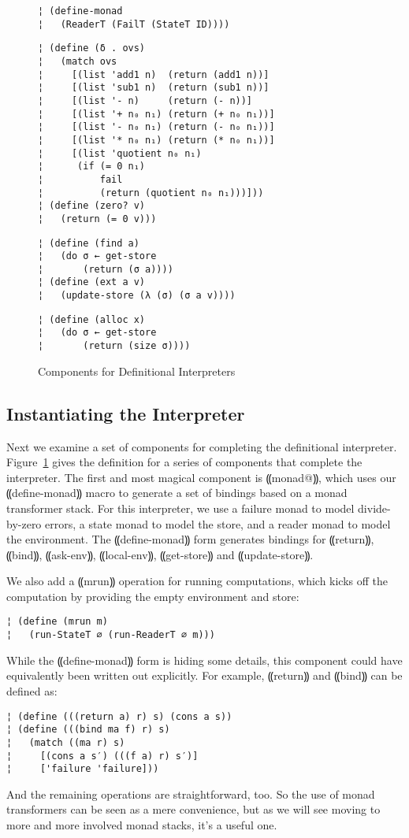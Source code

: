 \begin{figure}
\begin{lstlisting}
¦ (define-monad 
¦   (ReaderT (FailT (StateT ID))))
\end{lstlisting}
\figskip{}
\begin{lstlisting}
¦ (define (δ . ovs)
¦   (match ovs
¦     [(list 'add1 n)  (return (add1 n))]
¦     [(list 'sub1 n)  (return (sub1 n))]
¦     [(list '- n)     (return (- n))]
¦     [(list '+ n₀ n₁) (return (+ n₀ n₁))]
¦     [(list '- n₀ n₁) (return (- n₀ n₁))]
¦     [(list '* n₀ n₁) (return (* n₀ n₁))]
¦     [(list 'quotient n₀ n₁)
¦      (if (= 0 n₁)
¦          fail
¦          (return (quotient n₀ n₁)))]))
¦ (define (zero? v)
¦   (return (= 0 v)))
\end{lstlisting}
\figskip{}
\begin{lstlisting}
¦ (define (find a)
¦   (do σ ← get-store
¦       (return (σ a))))
¦ (define (ext a v) 
¦   (update-store (λ (σ) (σ a v))))
\end{lstlisting}
\figskip{}
\begin{lstlisting}
¦ (define (alloc x)
¦   (do σ ← get-store
¦       (return (size σ))))
\end{lstlisting}
\caption{Components for Definitional Interpreters}
\label{f:concrete-components}
\end{figure}

\subsection{Instantiating the Interpreter}

Next we examine a set of components for completing the definitional
interpreter.  Figure~\ref{f:concrete-components} gives the definition for a
series of components that complete the interpreter.  The first and most magical
component is ⸨monad@⸩, which uses our ⸨define-monad⸩ macro to generate a set of
bindings based on a monad transformer stack.  For this interpreter, we use a
failure monad to model divide-by-zero errors, a state monad to model the store,
and a reader monad to model the environment.  The ⸨define-monad⸩ form generates
bindings for ⸨return⸩, ⸨bind⸩, ⸨ask-env⸩, ⸨local-env⸩, ⸨get-store⸩ and
⸨update-store⸩. 

We also add a ⸨mrun⸩ operation for running computations, which kicks off the
computation by providing the empty environment and store:
\begin{lstlisting}
¦ (define (mrun m)
¦   (run-StateT ∅ (run-ReaderT ∅ m)))
\end{lstlisting}
While the ⸨define-monad⸩ form is hiding some details, this component could have
equivalently been written out explicitly. For example, ⸨return⸩ and ⸨bind⸩ can
be defined as:
\begin{lstlisting}
¦ (define (((return a) r) s) (cons a s))
¦ (define (((bind ma f) r) s)
¦   (match ((ma r) s)
¦     [(cons a s′) (((f a) r) s′)]
¦     ['failure 'failure]))
\end{lstlisting}
And the remaining operations are straightforward, too.  So the use of monad
transformers can be seen as a mere convenience, but as we will see moving to
more and more involved monad stacks, it's a useful one.

